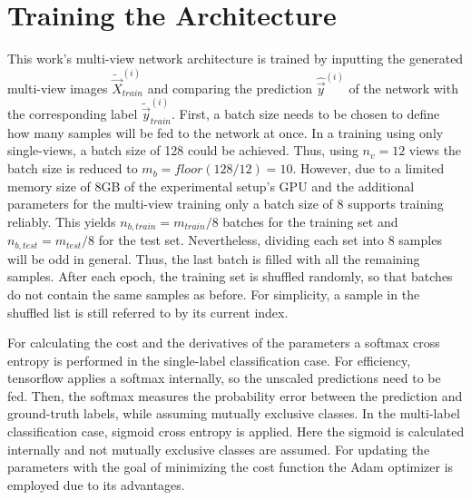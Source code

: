 \section{Training the Architecture}
\label{sec:methods-training}
This work's multi-view network architecture is trained by inputting the generated multi-view images $\tilde{\vec{X}}_{train}^{(i)}$ and comparing the prediction $\hat{\vec{y}}^{(i)}$ of the network with the corresponding label $\tilde{\vec{y}}_{train}^{(i)}$.
First, a batch size needs to be chosen to define how many samples will be fed to the network at once.
In a training using only single-views, a batch size of 128 could be achieved.
Thus, using $n_v = 12$ views the batch size is reduced to $m_b = floor(128 / 12) = 10$.
However, due to a limited memory size of 8GB of the experimental setup's GPU and the additional parameters for the multi-view training only a batch size of 8 supports training reliably.
This yields $n_{b,train} = m_{train} / 8$ batches for the training set and $n_{b,test} = m_{test} / 8$ for the test set.
Nevertheless, dividing each set into 8 samples will be odd in general.
Thus, the last batch is filled with all the remaining samples.
After each epoch, the training set is shuffled randomly, so that batches do not contain the same samples as before.
For simplicity, a sample in the shuffled list is still referred to by its current index.

For calculating the cost and the derivatives of the parameters a softmax cross entropy is performed in the single-label classification case.
For efficiency, tensorflow applies a softmax internally, so the unscaled predictions need to be fed.
Then, the softmax measures the probability error between the prediction and ground-truth labels, while assuming mutually exclusive classes.
In the multi-label classification case, sigmoid cross entropy is applied.
Here the sigmoid is calculated internally and not mutually exclusive classes are assumed.
For updating the parameters with the goal of minimizing the cost function the Adam optimizer is employed due to its advantages.

